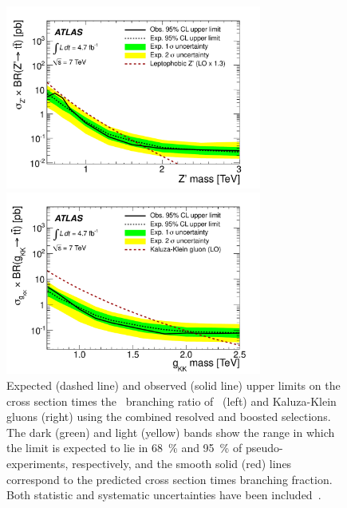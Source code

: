 \begin{figure}[htbp]
  \centering
  \includegraphics[width=0.75\textwidth]{PartTopQuark/Plots/fig_11a.pdf}

  \includegraphics[width=0.75\textwidth]{PartTopQuark/Plots/fig_11b.pdf}
  \caption[Expected (dashed line) and observed (solid line) upper limits on the cross section times the \ttbar\ branching ratio of \Zprime\ (left) and Kaluza-Klein gluons (right) using the combined resolved and boosted selections.]{Expected (dashed line) and observed (solid line) upper limits on the cross section times the \ttbar\ branching ratio of \Zprime\ (left) and Kaluza-Klein gluons (right) using the combined resolved and boosted selections. The dark (green) and light (yellow) bands show the range in which the limit is expected to lie in \SI{68}{\percent} and \SI{95}{\percent} of pseudo-experiments, respectively, and the smooth solid (red) lines correspond to the predicted cross section times branching fraction. Both statistic and systematic uncertainties have been included~\cite{Boosted:ATLASExclusion7TeV}.}\label{fig:BoostedLimits}
\end{figure}

